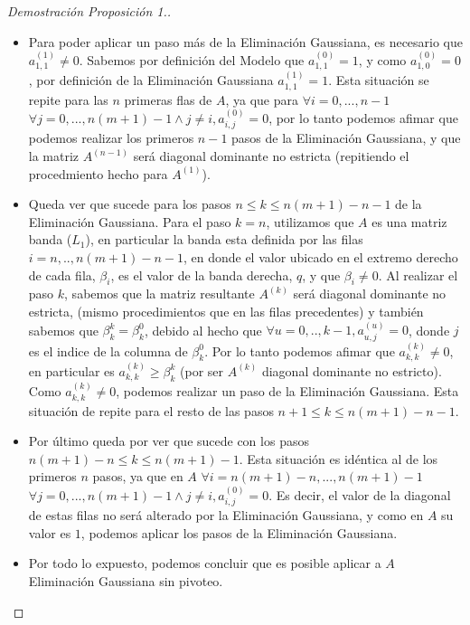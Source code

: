 \begin{proof}[Demostración Proposición 1.]
\begin{itemize}
\item Para poder aplicar un paso más de la Eliminación Gaussiana, es necesario que $a^{(1)}_{1,1} \neq 0$. Sabemos por definición del Modelo que $a^{(0)}_{1,1} = 1$, y como $a^{(0)}_{1,0} = 0$, por definición de la Eliminación Gaussiana $a^{(1)}_{1,1} = 1$. Esta situación se repite para las $n$ primeras flas de $A$, ya que para $\forall i=0,...,n-1$ $\forall j=0,...,n(m+1)-1 \land j \neq i, a^{(0)}_{i,j} = 0$, por lo tanto podemos afimar que podemos realizar los primeros $n-1$ pasos de la Eliminación Gaussiana, y que la matriz $A^{(n-1)}$ será diagonal dominante no estricta (repitiendo el procedmiento hecho para $A^{(1)}$).

\item Queda ver que sucede para los pasos $n \leq k \leq n(m+1)-n-1$ de la Eliminación Gaussiana. Para el paso $k=n$, utilizamos que $A$ es una matriz banda ($L_{1}$), en particular la banda esta definida por las filas $i=n,..,n(m+1)-n-1$, en donde el valor ubicado en el extremo derecho de cada fila, $\beta_{i}$, es el valor de la banda derecha, $q$, y que $\beta_{i} \neq 0$. Al realizar el paso $k$, sabemos que la matriz resultante $A^{(k)}$ será diagonal dominante no estricta, (mismo procedimientos que en las filas precedentes) y también sabemos que $\beta^{k}_{k} = \beta^{0}_{k}$, debido al hecho que $\forall u=0,..,k-1, a^{(u)}_{u,j} = 0$, donde $j$ es el indice de la columna de $\beta^{0}_{k}$. Por lo tanto podemos afimar que $a^{(k)}_{k,k} \neq 0$, en particular es $a^{(k)}_{k,k} \geq \beta^{k}_{k}$ (por ser $A^{(k)}$ diagonal dominante no estricto). Como $a^{(k)}_{k,k} \neq 0$, podemos realizar un paso de la Eliminación Gaussiana. Esta situación de repite para el resto de las pasos $n+1 \leq k \leq n(m+1)-n-1$.

\item Por último queda por ver que sucede con los pasos $ n(m+1)-n \leq k \leq n(m+1)-1$. Esta situación es idéntica al de los primeros $n$ pasos, ya que en $A$  $\forall i=n(m+1)-n,...,n(m+1)-1$ $\forall j=0,...,n(m+1)-1 \land j \neq i, a^{(0)}_{i,j} = 0$. Es decir, el valor de la diagonal de estas filas no será alterado por la Eliminación Gaussiana, y como en $A$ su valor es $1$, podemos aplicar los pasos de la Eliminación Gaussiana.

\item Por todo lo expuesto, podemos concluir que es posible aplicar a $A$ Eliminación Gaussiana sin pivoteo.

\end{itemize}

\end{proof}
